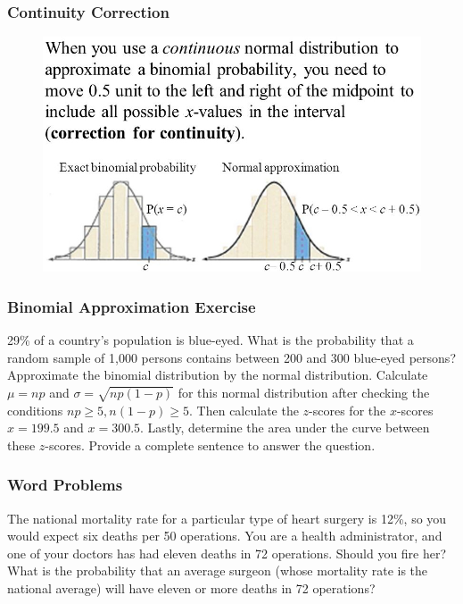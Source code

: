 \documentclass[xcolor=dvipsnames]{beamer}
\begin{document}
\begin{frame}
  \frametitle{Continuity Correction}
  \begin{figure}[h]
    \includegraphics[scale=.5]{./diagrams/contcorr_ed1.jpg}
  \end{figure}
\end{frame}

\begin{frame}
  \frametitle{Binomial Approximation Exercise}
{\ubung} 29\% of a country's population is blue-eyed. What is the
probability that a random sample of 1,000 persons contains between 200
and 300 blue-eyed persons? Approximate the binomial distribution by
the normal distribution. Calculate $\mu=np$ and
$\sigma=\sqrt{np(1-p)}$ for this normal distribution after checking
the conditions $np\geq{}5,n(1-p)\geq{}5$. Then calculate the
$z$-scores for the $x$-scores $x=199.5$ and $x=300.5$. Lastly,
determine the area under the curve between these $z$-scores. Provide a
complete sentence to answer the question.
\end{frame}

\begin{frame}
  \frametitle{Word Problems}
  {\ubung} The national mortality rate for a particular type of heart
  surgery is 12\%, so you would expect six deaths per 50 operations.
  You are a health administrator, and one of your doctors has had
  eleven deaths in 72 operations. Should you fire her? What is the
  probability that an average surgeon (whose mortality rate is the
  national average) will have eleven or more deaths in 72 operations?
\end{frame}
\end{document}
